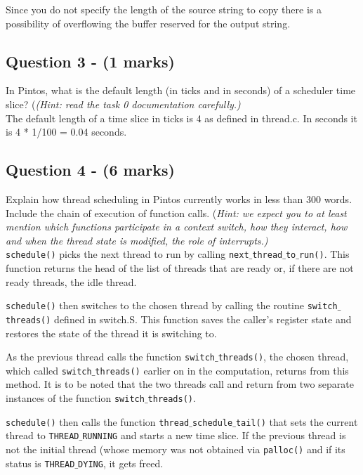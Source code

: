 \documentclass[a4paper,12pt]{article}
\begin{document}
Since you do not specify the length of the source string to copy there is a possibility of overflowing the buffer reserved for the output string.

\subsection*{Question 3 - (1 marks)}
In Pintos, what is the default length (in ticks and in seconds) of a scheduler time slice?
(\textit{(Hint: read the task 0 documentation carefully.)} \\

The default length of a time slice in ticks is 4 as defined in thread.c. In seconds it is 4 * 1/100 = 0.04 seconds.

\subsection*{Question 4 - (6 marks)}
Explain how thread scheduling in Pintos currently works in less than 300 words.
Include the chain of execution of function calls.
(\textit{Hint: we expect you to at least mention which functions participate in a context switch, how they interact, how and when the thread state is modified, the role of interrupts.)} \\

\texttt{schedule()} picks the next thread to run by calling \texttt{next$\_$thread$\_$to$\_$run()}. This function returns the head of the list of threads that are ready or, if there are not ready threads, the idle thread.

\texttt{schedule()}  then switches to the chosen thread by calling the routine \texttt{switch$\_$threads()} defined in switch.S. This function saves the caller’s register state and restores the state of the thread it is switching to.

As the previous thread calls the function \texttt{switch$\_$threads()}, the chosen thread, which called \texttt{switch$\_$threads()} earlier on in the computation, returns from this method. It is to be noted that the two threads call and return from two separate instances of the function \texttt{switch$\_$threads()}.

\texttt{schedule()} then calls the function \texttt{thread$\_$schedule$\_$tail()} that sets the current thread to \texttt{THREAD$\_$RUNNING} and starts a new time slice. If the previous thread is not the initial thread (whose memory was not obtained via \texttt{palloc()} and if its status is \texttt{THREAD$\_$DYING}, it gets freed.
\end{document}
